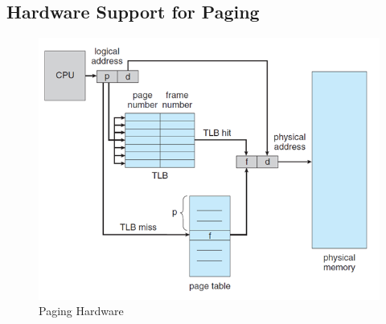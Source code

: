 \documentclass{article}
\theoremstyle{plain}
\theoremstyle{definition}
\begin{document}
\subsection{Hardware Support for Paging}
\begin{figure}[!h]
    \centering
    \includegraphics[scale=0.8]{os5.png}
    \caption{Paging Hardware}
    \label{fig:my_label_5}
\end{figure}
\end{document}
